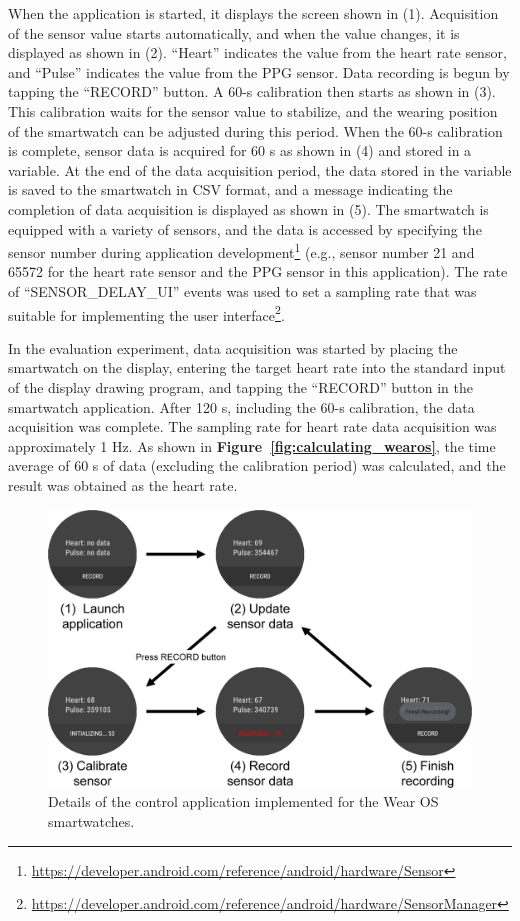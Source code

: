 \documentclass{ieeeaccess}
\newcommand\figref[1]{\textbf{Figure~\ref{fig:#1}}}
\begin{document}
When the application is started, it displays the screen shown in (1). Acquisition of the sensor value starts automatically, and when the value changes, it is displayed as shown in (2). ``Heart'' indicates the value from the heart rate sensor, and ``Pulse'' indicates the value from the PPG sensor. Data recording is begun by tapping the ``RECORD'' button. A 60-s calibration then starts as shown in (3). This calibration waits for the sensor value to stabilize, and the wearing position of the smartwatch can be adjusted during this period. When the 60-s calibration is complete, sensor data is acquired for 60 s as shown in (4) and stored in a variable. At the end of the data acquisition period, the data stored in the variable is saved to the smartwatch in CSV format, and a message indicating the completion of data acquisition is displayed as shown in (5). The smartwatch is equipped with a variety of sensors, and the data is accessed by specifying the sensor number during application development\footnote{\url{https://developer.android.com/reference/android/hardware/Sensor}} (e.g., sensor number 21 and 65572 for the heart rate sensor and the PPG sensor in this application). The rate of ``SENSOR\_DELAY\_UI'' events was used to set a sampling rate that was suitable for implementing the user interface\footnote{\url{https://developer.android.com/reference/android/hardware/SensorManager}}.\par

In the evaluation experiment, data acquisition was started by placing the smartwatch on the display, entering the target heart rate into the standard input of the display drawing program, and tapping the ``RECORD'' button in the smartwatch application. After 120 s, including the 60-s calibration, the data acquisition was complete. The sampling rate for heart rate data acquisition was approximately 1 Hz. As shown in \figref{calculating_wearos}, the time average of 60 s of data (excluding the calibration period) was calculated, and the result was obtained as the heart rate.

\begin{figure}[!t]
  \centering
  \includegraphics[width=1\linewidth]{figures/app.eps}
  \caption{Details of the control application implemented for the Wear OS smartwatches.}
  \label{fig:app}
\end{figure}
\end{document}
